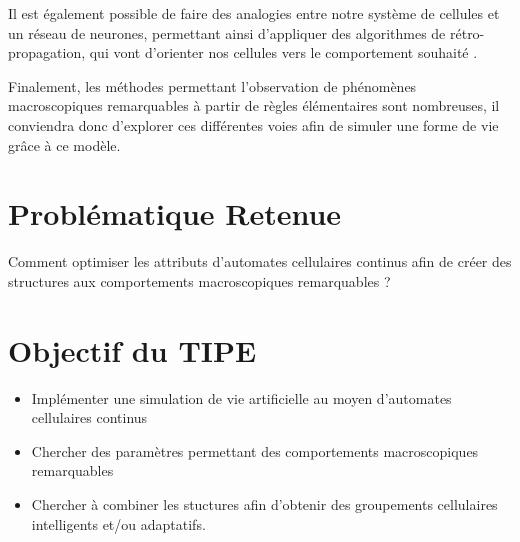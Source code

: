 \documentclass[a4paper, 11pt]{article}
\let\cite=\supercite
\begin{document}
Il est également possible de faire des analogies entre notre système de cellules et un
réseau de neurones, permettant ainsi d’appliquer des algorithmes de rétro-propagation,
qui vont d’orienter nos cellules vers le comportement souhaité
\cite{hamon:hal-03519319}.

Finalement, les méthodes permettant l’observation de phénomènes macroscopiques
remarquables à partir de règles élémentaires sont nombreuses, il conviendra donc
d’explorer ces différentes voies afin de simuler une forme de vie grâce à ce modèle.

\section*{Probl\'ematique Retenue}

Comment optimiser les attributs d’automates cellulaires continus afin de créer des
structures aux comportements macroscopiques remarquables ?

\section*{Objectif du TIPE}

\begin{itemize}
    \item Implémenter une simulation de vie artificielle au moyen d’automates
        cellulaires continus

    \item Chercher des paramètres permettant des comportements macroscopiques 
        remarquables

    \item Chercher à combiner les stuctures afin d’obtenir des groupements cellulaires
        intelligents et/ou adaptatifs.
\end{itemize}

\printbibliography[title=Références bibliographiques]
\end{document}
